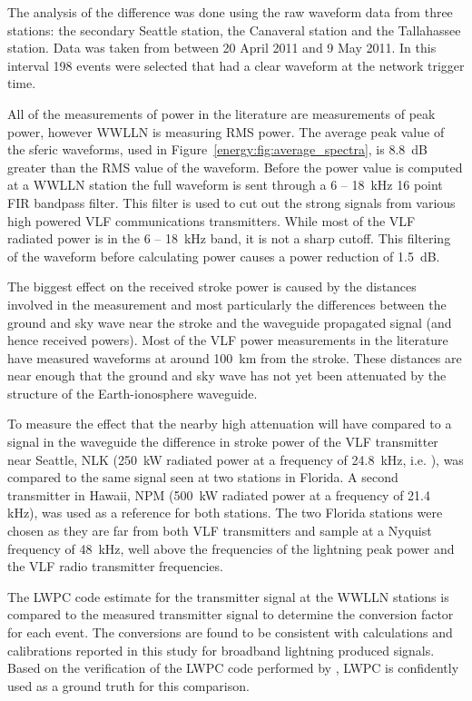 The analysis of the difference was done using the raw waveform data from three stations: the secondary Seattle station, the Canaveral station and the Tallahassee station.
Data was taken from between 20 April 2011 and 9 May 2011. In this interval 198 events were selected that had a clear waveform at the network trigger time.

All of the measurements of power in the literature are measurements of peak power, however WWLLN is measuring RMS power.
The average peak value of the sferic waveforms, used in Figure~\ref{energy:fig:average_spectra}, is 8.8~dB greater than the RMS value of the waveform. 
Before the power value is computed at a WWLLN station the full waveform is sent through a 6 -- 18~kHz 16 point FIR bandpass filter.
This filter is used to cut out the strong signals from various high powered VLF communications transmitters.
While most of the VLF radiated power is in the 6 -- 18~kHz band, it is not a sharp cutoff.
This filtering of the waveform before calculating power causes a power reduction of 1.5~dB.

The biggest effect on the received stroke power is caused by the distances involved in the measurement and most particularly the differences between the ground and sky wave near the stroke and the waveguide propagated signal (and hence received powers).
Most of the VLF power measurements in the literature have measured waveforms at around 100~km from the stroke.
These distances are near enough that the ground and sky wave has not yet been attenuated by the structure of the Earth-ionosphere waveguide.

To measure the effect that the nearby high attenuation will have compared to a signal in the waveguide the difference in stroke power of the VLF transmitter near Seattle, NLK (250~kW radiated power at a frequency of 24.8~kHz, i.e. \citet{Clilverd2009}), was compared to the same signal seen at two stations in Florida.
A second transmitter in Hawaii, NPM (500~kW radiated power at a frequency of 21.4 kHz), was used as a reference for both stations.
The two Florida stations were chosen as they are far from both VLF transmitters and sample at a Nyquist frequency of 48~kHz, well above the frequencies of the lightning peak power and the VLF radio transmitter frequencies.

The LWPC code estimate for the transmitter signal at the WWLLN stations is compared to the measured transmitter signal to determine the conversion factor for each event.
The conversions are found to be consistent with calculations and calibrations reported in this study for broadband lightning produced signals.
Based on the verification of the LWPC code performed by \citet{Thomson2010}, LWPC is confidently used as a ground truth for this comparison.


